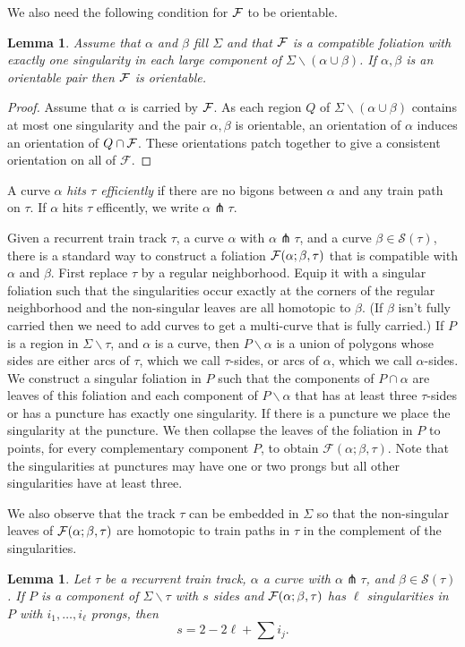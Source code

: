 \documentclass[11pt]{article}
\newtheorem{lemma}[thm]{Lemma}
\theoremstyle{remark}
\def\S{{\mathcal S}}
\def\F{{\mathcal F}}
\newcommand{\cF}{{\cal F}}
\begin{document}
We also need the following condition for $\cF$ to be orientable.
\begin{lemma}\label{induced orientation}
Assume that $\alpha$ and $\beta$ fill $\Sigma$ and that $\cF$ is a compatible foliation with exactly one singularity in each large component of $\Sigma\smallsetminus(\alpha\cup\beta)$. If $\alpha,\beta$ is an orientable pair then $\cF$ is orientable.
\end{lemma}
\begin{proof}
Assume that $\alpha$ is carried by $\cF$. As each region $Q$ of $\Sigma\smallsetminus (\alpha\cup \beta)$ contains at most one singularity and the pair $\alpha,\beta$ is orientable, an orientation of $\alpha$ induces an orientation of $Q\cap \cF$. These orientations patch together to give a consistent orientation on all of $\mathcal F$.
\end{proof}

A curve $\alpha$ \emph{hits $\tau$ efficiently} if there are no bigons between
$\alpha$ and any train path on $\tau$. If $\alpha$ hits $\tau$ efficently,
we write $\alpha\pitchfork \tau$.

Given a recurrent train track $\tau$, a curve $\alpha$ with $\alpha\pitchfork\tau$, and a
curve $\beta\in\S(\tau)$, there is a standard way to construct a foliation $\cF(\alpha;\beta, \tau)$ that is compatible with $\alpha$ and $\beta$.
First replace $\tau$ by a regular neighborhood. Equip it with a singular foliation such
that the singularities occur exactly at the corners of the regular neighborhood
and the non-singular leaves are all homotopic to $\beta$.
(If $\beta$ isn't fully carried then we need to add curves to get a multi-curve that is fully carried.)
If $P$ is a region in $\Sigma \smallsetminus \tau$, and $\alpha$ is a curve,
then $P\smallsetminus \alpha$ is a union of polygons whose sides are either
arcs of $\tau$, which we call $\tau$-sides, or arcs of $\alpha$, which we
call $\alpha$-sides.
We construct a
singular foliation in $P$ such that the components of $P\cap \alpha$ are leaves of
this foliation and each component of $P\smallsetminus \alpha$ that has at least three $\tau$-sides or has a puncture has exactly one singularity.
If there is a puncture we place the singularity at the puncture. We then collapse the leaves of the foliation in $P$ to points, for every complementary component $P$,
to obtain $\F(\alpha;\beta, \tau)$. Note that the singularities at punctures may have one or two prongs but all other singularities have at least three. 


We also observe that the track $\tau$ can be embedded in $\Sigma$ so that the non-singular leaves of $\cF(\alpha;\beta,\tau)$ are homotopic to train paths in $\tau$ in the complement of the singularities.
\begin{lemma}\label{train track side count}
Let $\tau$ be a recurrent train track, $\alpha$ a curve with $\alpha \pitchfork \tau$, and $\beta \in \S(\tau)$. If $P$ is a component of $\Sigma \smallsetminus \tau$ with $s$ sides and $\cF(\alpha;\beta, \tau)$ has $\ell$ singularities in $P$ with $i_1, \dots, i_\ell$ prongs, then
$$s = 2-2\ell + \sum i_j.$$
\end{lemma}
\end{document}
